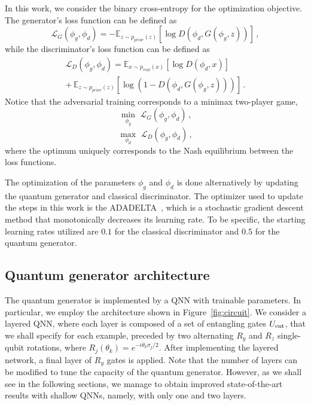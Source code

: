 \documentclass[twocolumn,preprintnumbers,superscriptaddress]{revtex4-2}
\begin{document}
In this work, we consider the binary cross-entropy for the optimization objective. The generator's loss function can be defined as
\begin{equation}
  \mathcal{L}_G(\phi_g,\phi_d) = -\mathbb{E}_{z \sim p_{prior}(z)}[\log D(\phi_d,G(\phi_g,z))]  \,,
\end{equation}
while the discriminator's loss function can be defined as
\begin{equation}
\begin{split}
  \mathcal{L}_D(\phi_g,\phi_d) = \mathbb{E}_{x \sim p_{real}(x)}[\log D(\phi_d,x)] \\+\, \mathbb{E}_{z \sim p_{prior}(z)}[\log (1-D(\phi_d,G(\phi_g,z)))]\,.
\end{split}
\end{equation}
Notice that the adversarial training corresponds to a minimax two-player game,
\begin{equation}
 \underset{\phi_g}{\min}\,\,\mathcal{L}_G(\phi_g,\phi_d)  \,,
\end{equation}
\begin{equation}
 \underset{\phi_d}{\max}\,\,\mathcal{L}_D(\phi_g,\phi_d)  \,,
\end{equation}
where the optimum uniquely corresponds to the Nash equilibrium between the loss functions.

The optimization of the parameters $\phi_g$ and $\phi_d$ is done alternatively by updating the quantum generator and classical discriminator. The optimizer used to update the steps in this work is the ADADELTA~\cite{zeiler2012adadelta}, which is a stochastic gradient descent method that monotonically decreases its learning rate. To be specific, the starting learning rates utilized are $0.1$ for the classical discriminator and $0.5$ for the quantum generator.

\subsection{Quantum generator architecture}
The quantum generator is implemented by a QNN with trainable parameters. In particular, we employ the architecture shown in Figure~\ref{fig:circuit}. We consider a layered QNN, where each layer is composed of a set of entangling gates $U_{\rm ent}$, that we shall specify for each example, preceded by two alternating $R_y$ and $R_z$ single-qubit rotations, where $R_j(\theta_k) = e^{-i\theta_k \sigma_j /2}$. After implementing the layered network, a final layer of $R_y$ gates is applied. Note that the number of layers can be modified to tune the capacity of the quantum generator. However, as we shall see in the following sections, we manage to obtain improved state-of-the-art results with shallow QNNs, namely, with only one and two layers.
\end{document}
